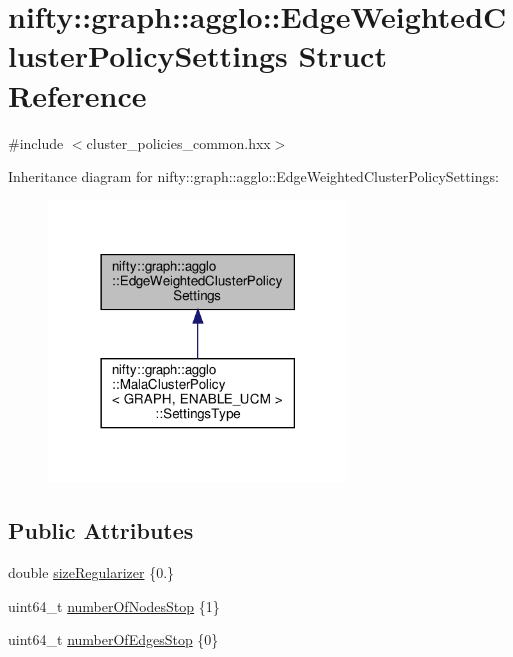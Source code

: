 \hypertarget{structnifty_1_1graph_1_1agglo_1_1EdgeWeightedClusterPolicySettings}{}\section{nifty\+:\+:graph\+:\+:agglo\+:\+:Edge\+Weighted\+Cluster\+Policy\+Settings Struct Reference}
\label{structnifty_1_1graph_1_1agglo_1_1EdgeWeightedClusterPolicySettings}


{\ttfamily \#include $<$cluster\+\_\+policies\+\_\+common.\+hxx$>$}



Inheritance diagram for nifty\+:\+:graph\+:\+:agglo\+:\+:Edge\+Weighted\+Cluster\+Policy\+Settings\+:
\nopagebreak
\begin{figure}[H]
\begin{center}
\leavevmode
\includegraphics[width=225pt]{structnifty_1_1graph_1_1agglo_1_1EdgeWeightedClusterPolicySettings__inherit__graph}
\end{center}
\end{figure}
\subsection*{Public Attributes}
\begin{DoxyCompactItemize}
\item 
double \hyperlink{structnifty_1_1graph_1_1agglo_1_1EdgeWeightedClusterPolicySettings_a16830167af377ff60fd7831c4ca30074}{size\+Regularizer} \{0.\}
\item 
uint64\+\_\+t \hyperlink{structnifty_1_1graph_1_1agglo_1_1EdgeWeightedClusterPolicySettings_a09a8f5ef7a4a14304439367054bf64cc}{number\+Of\+Nodes\+Stop} \{1\}
\item 
uint64\+\_\+t \hyperlink{structnifty_1_1graph_1_1agglo_1_1EdgeWeightedClusterPolicySettings_a34f45712a326b7e635a6ec6419bfe42b}{number\+Of\+Edges\+Stop} \{0\}
\end{DoxyCompactItemize}


